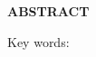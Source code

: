 \clearpage
{}
{}
\begin{center}
    \textbf{ABSTRACT}\\[0.5cm]
\end{center}

\lipsum[2-4]

\noindent Key words: \keywords